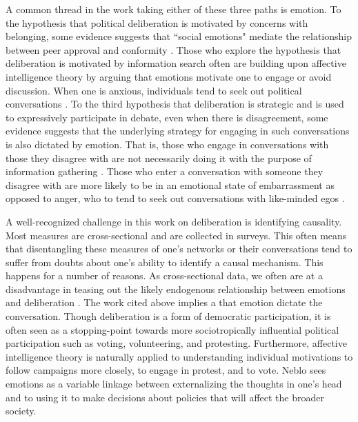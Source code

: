 \documentclass[12pt]{article}
\begin{document}
A common thread in the work taking either of these three paths is emotion. To the hypothesis that political deliberation is motivated by concerns with belonging, some evidence suggests that ``social emotions" mediate the relationship between peer approval and conformity \citep{suhay_2015_pb}. Those who explore the hypothesis that deliberation is motivated by information search often are building upon affective intelligence theory by arguing that emotions motivate one to engage or avoid discussion. When one is anxious, individuals tend to seek out political conversations \citep{mackuen_et-al_2010_ajps}. To the third hypothesis that deliberation is strategic and is used to expressively participate in debate, even when there is disagreement, some evidence suggests that the underlying strategy for engaging in such conversations is also dictated by emotion. That is, those who engage in conversations with those they disagree with are not necessarily doing it with the purpose of information gathering \citep{lyons_sokhey_2014_pc}. Those who enter a conversation with someone they disagree with are more likely to be in an emotional state of embarrassment as opposed to anger, who to tend to seek out conversations with like-minded egos \citep{wolak_sokhey_2022_apr}.

A well-recognized challenge in this work on deliberation is identifying causality. Most measures are cross-sectional and are collected in surveys. This often means that disentangling these measures of one's networks or their conversations tend to suffer from doubts about one's ability to identify a causal mechanism. This happens for a number of reasons. As cross-sectional data, we often are at a disadvantage in teasing out the likely endogenous relationship between emotions and deliberation \citep{sokhey_stapleton_2020_oh}. The work cited above implies a that emotion dictate the conversation. Though deliberation is a form of democratic participation, it is often seen as a stopping-point towards more sociotropically influential political participation such as voting, volunteering, and protesting. Furthermore, affective intelligence theory is naturally applied to understanding individual motivations to follow campaigns more closely, to engage in protest, and to vote. Neblo \citeyearpar{neblo_2020_apsr} sees emotions as a variable linkage between externalizing the thoughts in one's head and to using it to make decisions about policies that will affect the broader society. 
\end{document}
